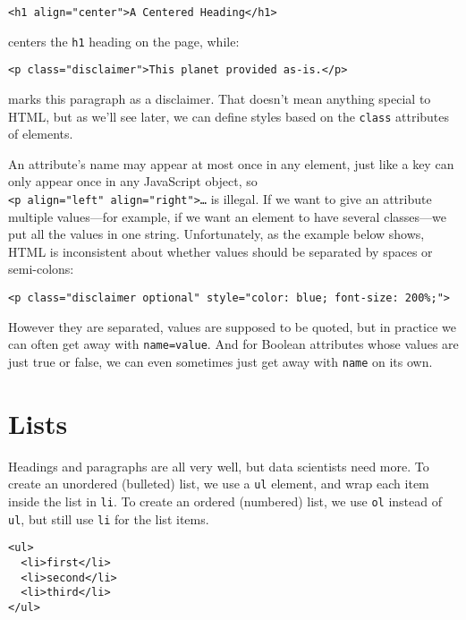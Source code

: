 \begin{verbatim}
<h1 align="center">A Centered Heading</h1>
\end{verbatim}

centers the \texttt{h1} heading on the page, while:

\begin{verbatim}
<p class="disclaimer">This planet provided as-is.</p>
\end{verbatim}

\noindent
marks this paragraph as a disclaimer.
That doesn't mean anything special to HTML,
but as we'll see later,
we can define styles based on the \texttt{class} attributes of elements.

An attribute's name may appear at most once in any element,
just like a key can only appear once in any JavaScript object,
so \texttt{{\textless}p\ align="left"\ align="right"{\textgreater}{\ldots}} is illegal.
If we want to give an attribute multiple values---for example,
if we want an element to have several classes---we put all the values in one string.
Unfortunately,
as the example below shows,
HTML is inconsistent about whether values should be separated by spaces or semi-colons:

\begin{verbatim}
<p class="disclaimer optional" style="color: blue; font-size: 200%;">
\end{verbatim}

However they are separated,
values are supposed to be quoted,
but in practice we can often get away with \texttt{name=value}.
And for Boolean attributes whose values are just true or false,
we can even sometimes just get away with \texttt{name} on its own.

\section{Lists}\label{s:htmlcss-lists}

Headings and paragraphs are all very well,
but data scientists need more.
To create an unordered (bulleted) list,
we use a \texttt{ul} element,
and wrap each item inside the list in \texttt{li}.
To create an ordered (numbered) list,
we use \texttt{ol} instead of \texttt{ul},
but still use \texttt{li} for the list items.

\begin{verbatim}
<ul>
  <li>first</li>
  <li>second</li>
  <li>third</li>
</ul>
\end{verbatim}


